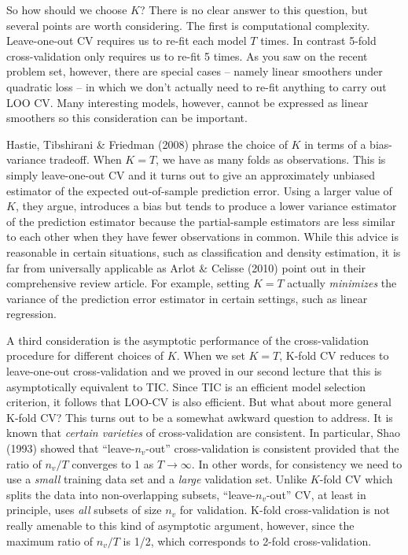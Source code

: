 \documentclass[12pt]{article}
\theoremstyle{definition}
\begin{document}
So how should we choose $K$? There is no clear answer to this question, but several points are worth considering. The first is computational complexity. Leave-one-out CV requires us to re-fit each model $T$ times. In contrast 5-fold cross-validation only requires us to re-fit 5 times. As you saw on the recent problem set, however, there are special cases -- namely linear smoothers under quadratic loss -- in which we don't actually need to re-fit anything to carry out LOO CV. Many interesting models, however, cannot be expressed as linear smoothers so this consideration can be important. 

Hastie, Tibshirani \& Friedman (2008) phrase the choice of $K$ in terms of a bias-variance tradeoff. When $K = T$, we have as many folds as observations. This is simply leave-one-out CV and it turns out to give an approximately unbiased estimator of the expected out-of-sample prediction error. Using a larger value of $K$, they argue, introduces a bias but tends to produce a lower variance estimator of the prediction estimator because the partial-sample estimators are less similar to each other when they have fewer observations in common. While this advice is reasonable in certain situations, such as classification and density estimation, it is far from universally applicable as Arlot \& Celisse (2010) point out in their comprehensive review article. For example, setting $K=T$ actually \emph{minimizes} the variance of the prediction error estimator in certain settings, such as linear regression.

A third consideration is the asymptotic performance of the cross-validation procedure for different choices of $K$. When we set $K = T$, K-fold CV reduces to leave-one-out cross-validation and we proved in our second lecture that this is asymptotically equivalent to TIC. Since TIC is an efficient model selection criterion, it follows that LOO-CV is also efficient. But what about more general K-fold CV? This turns out to be a somewhat awkward question to address. It is known that \emph{certain varieties} of cross-validation are consistent. In particular, Shao (1993) showed that ``leave-$n_v$-out'' cross-validation is consistent provided that the ratio of $n_v/T$ converges to 1 as $T\rightarrow \infty$. In other words, for consistency we need to use a \emph{small} training data set and a \emph{large} validation set. Unlike $K$-fold CV which splits the data into non-overlapping subsets, ``leave-$n_v$-out'' CV, at least in principle, uses \emph{all} subsets of size $n_v$ for validation. K-fold cross-validation is not really amenable to this kind of asymptotic argument, however, since the maximum ratio of $n_v/T$ is 1/2, which corresponds to 2-fold cross-validation. 
\end{document}
